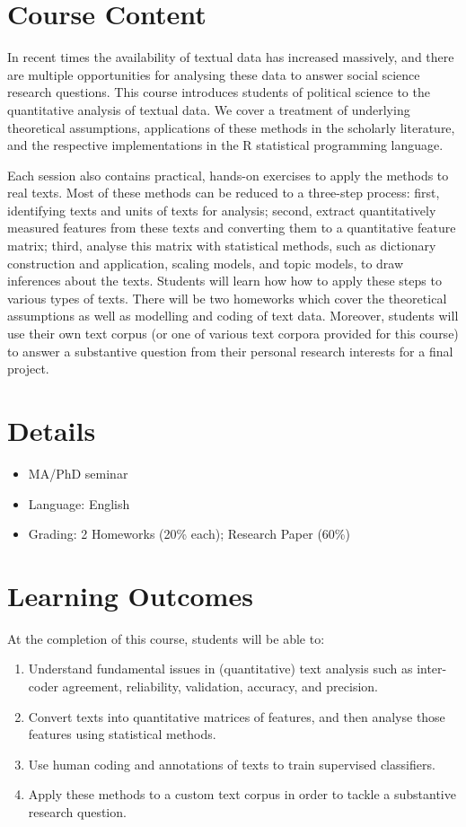 \documentclass[abstract=on,parskip=full,headings=standardclasses,fontsize=11pt,paper=a4]{scrartcl}
\begin{document}
\section*{Course Content}

In recent times the availability of textual data has increased massively, and there are multiple opportunities for analysing these data to answer social science research questions. This course introduces students of political science to the quantitative analysis of textual data. We cover a treatment of underlying theoretical assumptions, applications of these methods in the scholarly literature, and the respective implementations in the \textsf{R} statistical programming language.

Each session also contains practical, hands-on exercises to apply the methods to real texts. Most of these methods can be reduced to a three-step process: first, identifying texts and units of texts for analysis; second, extract quantitatively measured features from these texts and converting them to a quantitative feature matrix; third, analyse this matrix with statistical methods, such as dictionary construction and application, scaling models, and topic models, to draw inferences about the texts. Students will learn how how to apply these steps to various types of texts. There will be two homeworks which cover the theoretical assumptions as well as modelling and coding of text data. Moreover, students will use their own text corpus (or one of various text corpora provided for this course) to answer a substantive question from their personal research interests for a final project.


\section*{Details}

\begin{itemize}
\item MA/PhD seminar
\item  Language: English
\item Grading: 2 Homeworks (20\% each); Research Paper (60\%)
\end{itemize}

\section*{Learning Outcomes}

At the completion of this course, students will be able to:
\begin{enumerate}
\item Understand fundamental issues in (quantitative) text analysis such as inter-coder agreement, reliability, validation, accuracy, and precision.
\item Convert texts into quantitative matrices of features, and then analyse those features using statistical methods.
\item Use human coding and annotations of texts to train supervised classifiers.
\item  Apply these methods to a custom text corpus in order to tackle a substantive research question.
\end{enumerate}
\end{document}
